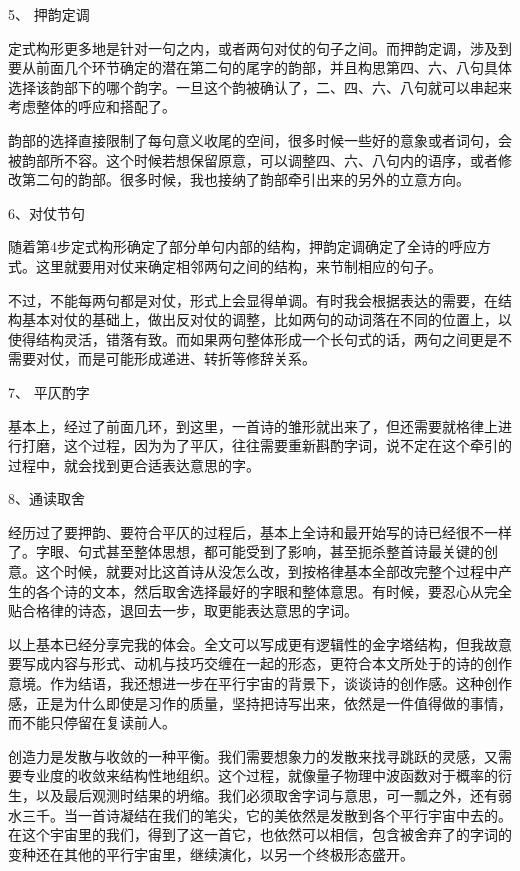 \documentclass{article}
\begin{document}
5、 押韵定调

定式构形更多地是针对一句之内，或者两句对仗的句子之间。而押韵定调，涉及到要从前面几个环节确定的潜在第二句的尾字的韵部，并且构思第四、六、八句具体选择该韵部下的哪个韵字。一旦这个韵被确认了，二、四、六、八句就可以串起来考虑整体的呼应和搭配了。

韵部的选择直接限制了每句意义收尾的空间，很多时候一些好的意象或者词句，会被韵部所不容。这个时候若想保留原意，可以调整四、六、八句内的语序，或者修改第二句的韵部。很多时候，我也接纳了韵部牵引出来的另外的立意方向。

6、对仗节句

随着第4步定式构形确定了部分单句内部的结构，押韵定调确定了全诗的呼应方式。这里就要用对仗来确定相邻两句之间的结构，来节制相应的句子。

不过，不能每两句都是对仗，形式上会显得单调。有时我会根据表达的需要，在结构基本对仗的基础上，做出反对仗的调整，比如两句的动词落在不同的位置上，以使得结构灵活，错落有致。而如果两句整体形成一个长句式的话，两句之间更是不需要对仗，而是可能形成递进、转折等修辞关系。

7、 平仄酌字

基本上，经过了前面几环，到这里，一首诗的雏形就出来了，但还需要就格律上进行打磨，这个过程，因为为了平仄，往往需要重新斟酌字词，说不定在这个牵引的过程中，就会找到更合适表达意思的字。

8、通读取舍

经历过了要押韵、要符合平仄的过程后，基本上全诗和最开始写的诗已经很不一样了。字眼、句式甚至整体思想，都可能受到了影响，甚至扼杀整首诗最关键的创意。这个时候，就要对比这首诗从没怎么改，到按格律基本全部改完整个过程中产生的各个诗的文本，然后取舍选择最好的字眼和整体意思。有时候，要忍心从完全贴合格律的诗态，退回去一步，取更能表达意思的字词。

以上基本已经分享完我的体会。全文可以写成更有逻辑性的金字塔结构，但我故意要写成内容与形式、动机与技巧交缠在一起的形态，更符合本文所处于的诗的创作意境。作为结语，我还想进一步在平行宇宙的背景下，谈谈诗的创作感。这种创作感，正是为什么即使是习作的质量，坚持把诗写出来，依然是一件值得做的事情，而不能只停留在复读前人。

创造力是发散与收敛的一种平衡。我们需要想象力的发散来找寻跳跃的灵感，又需要专业度的收敛来结构性地组织。这个过程，就像量子物理中波函数对于概率的衍生，以及最后观测时结果的坍缩。我们必须取舍字词与意思，可一瓢之外，还有弱水三千。当一首诗凝结在我们的笔尖，它的美依然是发散到各个平行宇宙中去的。在这个宇宙里的我们，得到了这一首它，也依然可以相信，包含被舍弃了的字词的变种还在其他的平行宇宙里，继续演化，以另一个终极形态盛开。
\end{document}
